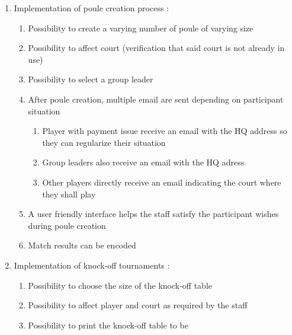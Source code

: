 \begin{enumerate}
\begin{enumerate}
{made on courts}
\item \textcolor{green!60!black} {An Email confirmation is sent at court registration}
\item \textcolor{green!60!black} {Possibility to create/edit/delete court for staff member}
\item \textcolor{green!60!black} {List and search functions on the court data are available}
\end{enumerate}
\item Implementation of poule creation process :
\begin{enumerate} \itemsep1pt
\item \textcolor{green!60!black} {Possibility to create a varying number of poule 
of varying size}
\item \textcolor{green!60!black} {Possibility to affect court (verification that
 said court is not already in use)}
\item \textcolor{green!60!black} {Possibility to select a group leader}
\item \textcolor{green!60!black} {After poule creation, multiple email are sent 
depending on participant situation}
	\begin{enumerate} \itemsep1pt
	\item \textcolor{green!60!black} {Player with payment issue receive an email 
	with the HQ address so they can regularize their situation}
	\item \textcolor{green!60!black} {Group leaders also receive an email with the 
	HQ adress}
	\item \textcolor{green!60!black} {Other players directly receive an email 
	indicating the court where they shall play}
	\end{enumerate}
\item \textcolor{green!60!black} {A user friendly interface helps the staff 
satisfy the participant wishes during poule creation}
\item \textcolor{green!60!black} {Match results can be encoded}
\end{enumerate}
\item Implementation of knock-off tournaments : \newline
\begin{enumerate} \itemsep1pt
\item \textcolor{green!60!black} {Possibility to choose the size of the 
knock-off table}
\item \textcolor{green!60!black} {Possibility to affect player and court as 
required by the staff}
\item \textcolor{green!60!black} {Possibility to print the knock-off table to be
}
\end{enumerate}
\end{enumerate}
